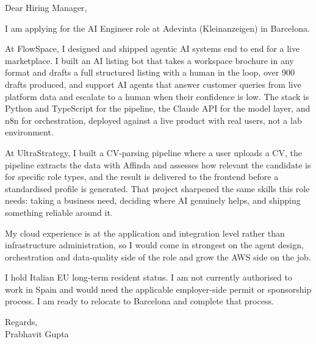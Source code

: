 \documentclass[a4paper,11pt]{article}
\begin{document}
Dear Hiring Manager,

I am applying for the AI Engineer role at Adevinta (Kleinanzeigen) in Barcelona.

At FlowSpace, I designed and shipped agentic AI systems end to end for a live marketplace. I built an AI listing bot that takes a workspace brochure in any format and drafts a full structured listing with a human in the loop, over 900 drafts produced, and support AI agents that answer customer queries from live platform data and escalate to a human when their confidence is low. The stack is Python and TypeScript for the pipeline, the Claude API for the model layer, and n8n for orchestration, deployed against a live product with real users, not a lab environment.

At UltraStrategy, I built a CV-parsing pipeline where a user uploads a CV, the pipeline extracts the data with Affinda and assesses how relevant the candidate is for specific role types, and the result is delivered to the frontend before a standardised profile is generated. That project sharpened the same skills this role needs: taking a business need, deciding where AI genuinely helps, and shipping something reliable around it.

My cloud experience is at the application and integration level rather than infrastructure administration, so I would come in strongest on the agent design, orchestration and data-quality side of the role and grow the AWS side on the job.

I hold Italian EU long-term resident status. I am not currently authorised to work in Spain and would need the applicable employer-side permit or sponsorship process. I am ready to relocate to Barcelona and complete that process.

Regards,\\
Prabhavit Gupta
\end{document}
